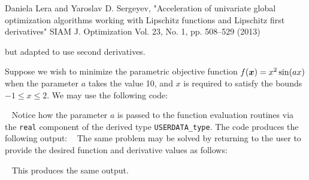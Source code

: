\documentclass{galahad}
\begin{document}
\noindent
Daniela Lera and Yaroslav D. Sergeyev,
"Acceleration of univariate global optimization algorithms working with
 Lipschitz functions and Lipschitz first derivatives"
SIAM J. Optimization Vol. 23, No. 1, pp. 508–529 (2013)

\noindent
but adapted to use second derivatives.


\galexamples
Suppose we wish to minimize the parametric objective function
$f({\bm{x}}) =  x^2 \sin(ax)$
when the parameter $a$ takes the value 10, and $x$ is required to satisfy
the  bounds $-1 \leq x \leq 2$.
We may use the following code:

{\tt \small
\VerbatimInput{\packageexample}
}
\noindent
Notice how the parameter $a$ is passed to the function evaluation
routines via the {\tt real} component of the derived type {\tt USERDATA\_type}.
The code produces the following output:
{\tt \small
\VerbatimInput{\packageresults}
}
\noindent
The same problem may be solved by returning to the user to provide
the desired function and derivative values as follows:

{\tt \small
\VerbatimInput{\packageexampleb}
}
\noindent
This produces the same output.
\end{document}

